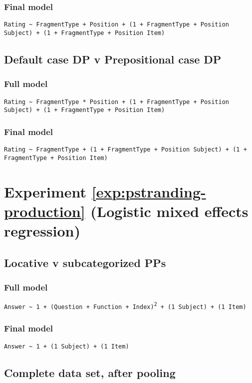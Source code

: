 \subsubsection*{Final model}
\texttt{Rating \textasciitilde {} FragmentType + Position + (1 + FragmentType + Position{} \textbar {} Subject) + (1 + FragmentType + Position{} \textbar {} Item)}


\subsection*{Default case DP v Prepositional case DP}
\subsubsection*{Full model}
\texttt{Rating \textasciitilde {} FragmentType * Position + (1 + FragmentType + Position{} \textbar {} Subject) + (1 + FragmentType + Position{} \textbar {} Item)}

\subsubsection*{Final model}
\texttt{Rating \textasciitilde {} FragmentType + (1 + FragmentType + Position{} \textbar {} Subject) + (1 + FragmentType + Position{} \textbar {} Item)}

\section*{Experiment \ref{exp:pstranding-production} (Logistic mixed effects regression)}
\subsection*{Locative v subcategorized PPs}
\subsubsection*{Full model}
\texttt{Answer \textasciitilde {} 1 + (Question + Function + Index)\textsuperscript{2} + (1  {}\textbar {} Subject) + (1  {}\textbar {} Item)}

\subsubsection*{Final model}
\texttt{Answer \textasciitilde {} 1 + (1  {}\textbar {} Subject) + (1  {}\textbar {} Item)}

\subsection*{Complete data set, after pooling}
